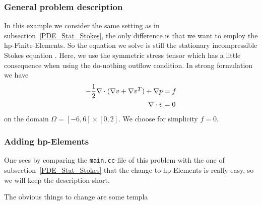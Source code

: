 \subsubsection{General problem description}
In this example we consider the same setting as in subsection~\ref{PDE_Stat_Stokes}, the only
difference is that we want to employ the hp-Finite-Elements. So the equation we solve is still 
the stationary incompressible Stokes equation . Here,
we use the symmetric stress tensor which has a little consequence when using 
the do-nothing outflow condition. In strong formulation we have
\begin{align} \label{eq:strong}
-\frac{1}{2}\nabla\cdot (\nabla v + \nabla v^{T}) + \nabla p &= f \\ 
\nabla \cdot v &= 0 \notag
\end{align} 
on the domain $\Omega = [-6,6]\times [0,2]$. We choose for simplicity $f=0$.\\

\subsubsection{Adding hp-Elements}
One sees by comparing  the \texttt{main.cc}-file of this problem with the one of subsection~\ref{PDE_Stat_Stokes} that the change to hp-Elements is really easy, so we will keep the description short. 

The obvious things to change are some templa


